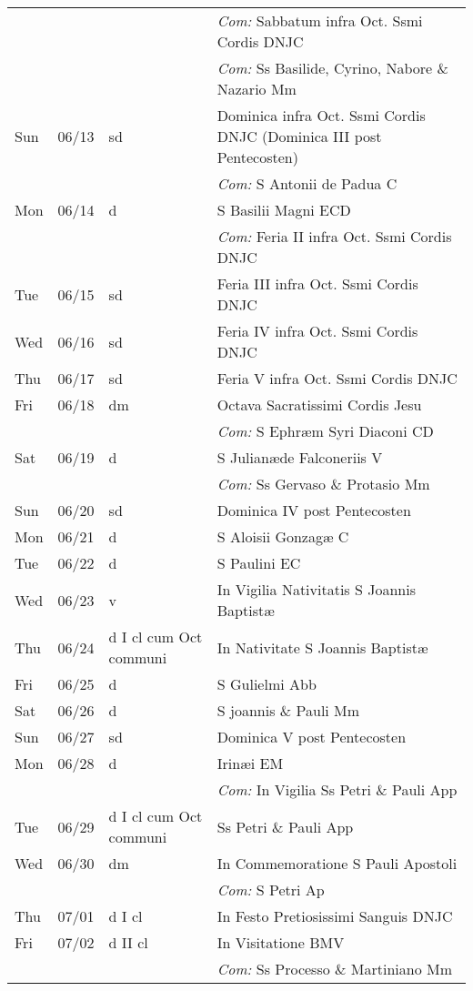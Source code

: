 \documentclass[10pt]{article}
\begin{document}
\begin{longtable}{ l l l l }
 & & & \textit{Com:} Sabbatum infra Oct. Ssmi Cordis DNJC\\
 & & & \textit{Com:} Ss Basilide, Cyrino, Nabore \& Nazario Mm\\
Sun & 06/13 & sd & Dominica infra Oct. Ssmi Cordis DNJC (Dominica III post Pentecosten)\\
 & & & \textit{Com:} S Antonii de Padua C\\
Mon & 06/14 & d & S Basilii Magni ECD\\
 & & & \textit{Com:} Feria II infra Oct. Ssmi Cordis DNJC\\
Tue & 06/15 & sd & Feria III infra Oct. Ssmi Cordis DNJC\\
Wed & 06/16 & sd & Feria IV infra Oct. Ssmi Cordis DNJC\\
Thu & 06/17 & sd & Feria V infra Oct. Ssmi Cordis DNJC\\
Fri & 06/18 & dm & Octava Sacratissimi Cordis Jesu\\
 & & & \textit{Com:} S Ephræm Syri Diaconi CD\\
Sat & 06/19 & d & S Julianæde Falconeriis V\\
 & & & \textit{Com:} Ss Gervaso \& Protasio Mm\\
Sun & 06/20 & sd & Dominica IV post Pentecosten\\
Mon & 06/21 & d & S Aloisii Gonzagæ C\\
Tue & 06/22 & d & S Paulini EC\\
Wed & 06/23 & v & In Vigilia Nativitatis S Joannis Baptistæ\\
Thu & 06/24 & d I cl cum Oct communi & In Nativitate S Joannis Baptistæ\\
Fri & 06/25 & d & S Gulielmi Abb\\
Sat & 06/26 & d & S joannis \& Pauli Mm\\
Sun & 06/27 & sd & Dominica V post Pentecosten\\
Mon & 06/28 & d & Irinæi EM\\
 & & & \textit{Com:} In Vigilia Ss Petri \& Pauli App\\
Tue & 06/29 & d I cl cum Oct communi & Ss Petri \& Pauli App\\
Wed & 06/30 & dm & In Commemoratione S Pauli Apostoli\\
 & & & \textit{Com:} S Petri Ap\\
Thu & 07/01 & d I cl & In Festo Pretiosissimi Sanguis DNJC\\
Fri & 07/02 & d II cl & In Visitatione BMV\\
 & & & \textit{Com:} Ss Processo \& Martiniano Mm\\

\end{longtable}
\end{document}
